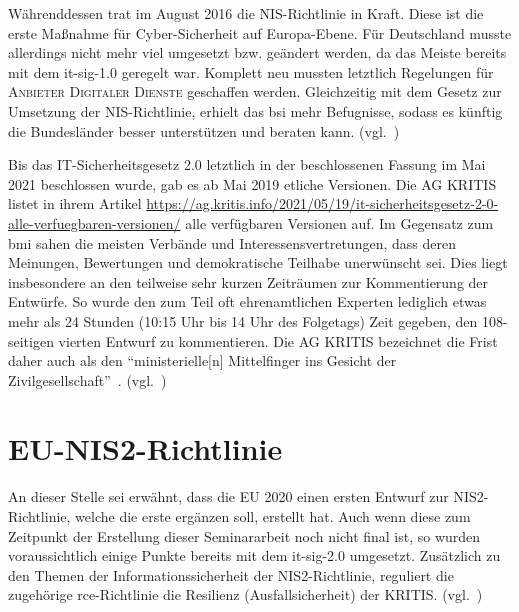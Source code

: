 Währenddessen trat im August 2016 die NIS-Richtlinie in Kraft.
Diese ist die erste Maßnahme für Cyber-Sicherheit auf Europa-Ebene.
Für Deutschland musste allerdings nicht mehr viel umgesetzt bzw. geändert werden,
da das Meiste bereits mit dem \acrshort{it-sig-1.0} geregelt war.
Komplett neu mussten letztlich Regelungen für \textsc{Anbieter Digitaler Dienste} geschaffen werden.
Gleichzeitig mit dem Gesetz zur Umsetzung der NIS-Richtlinie,
erhielt das \acrshort{bsi} mehr Befugnisse, sodass es künftig die Bundesländer besser unterstützen und beraten kann.
(vgl.~\cite{gesetz-zur-umsetzung-der-nis-richtlinie})

Bis das IT-Sicherheitsgesetz 2.0 letztlich in der beschlossenen Fassung im Mai 2021 beschlossen wurde,
gab es ab Mai 2019 etliche Versionen.
Die AG KRITIS listet in ihrem Artikel \url{https://ag.kritis.info/2021/05/19/it-sicherheitsgesetz-2-0-alle-verfuegbaren-versionen/} alle verfügbaren Versionen auf.
Im Gegensatz zum \acrshort{bmi} sahen die meisten Verbände und Interessensvertretungen, dass deren Meinungen, Bewertungen und demokratische Teilhabe unerwünscht sei.
Dies liegt insbesondere an den teilweise sehr kurzen Zeiträumen zur Kommentierung der Entwürfe.
So wurde den zum Teil oft ehrenamtlichen Experten lediglich etwas mehr als 24 Stunden (10:15 Uhr bis 14 Uhr des Folgetags) Zeit gegeben,
den 108-seitigen vierten Entwurf zu kommentieren.
Die AG KRITIS bezeichnet die Frist daher auch als den \enquote{ministerielle[n] Mittelfinger ins Gesicht der Zivilgesellschaft}~\cite{it-sig-2.0-vierter-entwurf-24h}.
(vgl.~\cite{it-sig-2.0-alle-vers,it-sig-2.0-vierter-entwurf-24h})

\section{EU-NIS2-Richtlinie}\label{sec:eu-nis2-richtlinie}
An dieser Stelle sei erwähnt, dass die EU 2020 einen ersten Entwurf zur NIS2-Richtlinie, welche die erste ergänzen soll,
erstellt hat.
Auch wenn diese zum Zeitpunkt der Erstellung dieser Seminararbeit noch nicht final ist,
so wurden voraussichtlich einige Punkte bereits mit dem \acrshort{it-sig-2.0} umgesetzt.
Zusätzlich zu den Themen der Informationssicherheit der NIS2-Richtlinie,
reguliert die zugehörige \acrshort{rce}-Richtlinie die Resilienz (Ausfallsicherheit) der KRITIS\@.
(vgl.~\cite{eu-nis-rce})
